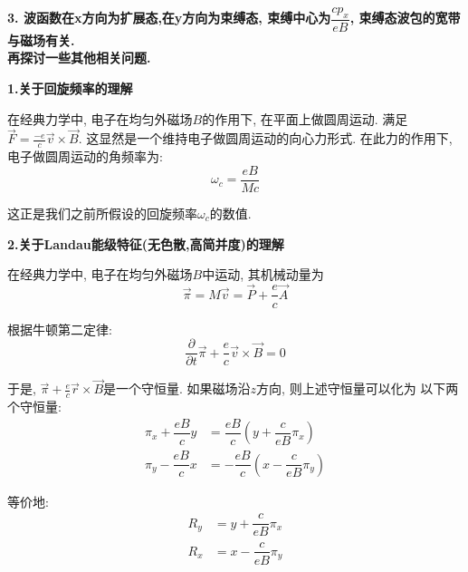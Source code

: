 \documentclass[a4paper, 11pt]{article}
\begin{document}
\begin{spacing}{1.2}
        \textbf{3. 波函数在x方向为扩展态,在y方向为束缚态, 束缚中心为$\dfrac{cp_x}{eB}$, 束缚态波包的宽带与磁场有关.}
        \ \\

        \textbf{再探讨一些其他相关问题.}

        \textbf{1.关于回旋频率的理解}
        
        在经典力学中, 电子在均匀外磁场$B$的作用下, 在平面上做圆周运动. 满足$\vec{F} =\frac{-e}{c}\vec{v}\times \vec{B}$.
        这显然是一个维持电子做圆周运动的向心力形式. 在此力的作用下, 电子做圆周运动的角频率为:
        \begin{equation}
          \omega_c = \dfrac{eB}{Mc}
        \end{equation}

        这正是我们之前所假设的回旋频率$\omega_c$的数值.
        
        \textbf{2.关于Landau能级特征(无色散,高简并度)的理解}

        在经典力学中, 电子在均匀外磁场$B$中运动, 其机械动量为
        \begin{equation}
          \vec{\pi} = M\vec{v} = \vec{P}+\dfrac{e}{c}\vec{A}
        \end{equation}

        根据牛顿第二定律:
        \begin{equation}
          \dfrac{\partial}{\partial{}t}\vec{\pi} + \dfrac{e}{c}\vec{v}\times\vec{B} = 0
        \end{equation}

        于是, $\vec{\pi}+\frac{e}{c}\vec{r}\times\vec{B}$是一个守恒量. 如果磁场沿$z$方向, 则上述守恒量可以化为
        以下两个守恒量:
        \begin{subequations}
          \begin{align}
            \pi_x+\dfrac{eB}{c}y &= \dfrac{eB}{c}\left(y+\dfrac{c}{eB}\pi_x\right)\\
            \pi_y-\dfrac{eB}{c}x &= -\dfrac{eB}{c}\left(x-\dfrac{c}{eB}\pi_y\right)
          \end{align}
        \end{subequations}

        等价地:
        \begin{subequations}
          \begin{align}
            R_y &= y+\dfrac{c}{eB}\pi_x\\
            R_x &= x-\dfrac{c}{eB}\pi_y
          \end{align}
        \end{subequations}


\end{spacing}
\end{document}
